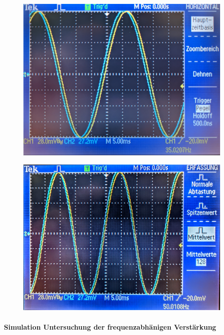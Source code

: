 \documentclass[12pt,english,ngerman]{scrartcl}
\begin{document}
\begin{figure}[H]
  \centering
    \includegraphics[width=0.95\textwidth]{./figures/integrator/35hz.jpg}
  \caption{}
  \label{fig:mess_integrator_35hz}
\end{figure}

\begin{figure}[H]
  \centering
   \includegraphics[width=0.95\textwidth]{./figures/integrator/50hz.jpg}
  \caption{}
  \label{fig:mess_integrator_50hz}
\end{figure}

\paragraph{Simulation Untersuchung der frequenzabhänigen Verstärkung}
\end{document}
